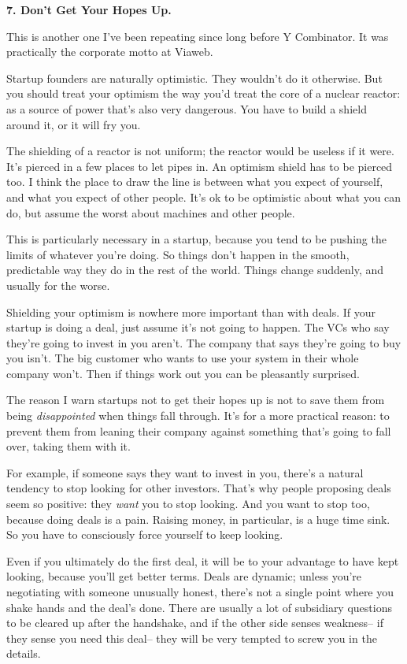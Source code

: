 \documentclass[12pt]{book}
\begin{document}
\textbf{7. Don't Get Your Hopes Up.}

This is another one I've been repeating since long before Y Combinator.
It was practically the corporate motto at Viaweb.

Startup founders are naturally optimistic. They wouldn't do it
otherwise. But you should treat your optimism the way you'd treat the
core of a nuclear reactor: as a source of power that's also very
dangerous. You have to build a shield around it, or it will fry you.

The shielding of a reactor is not uniform; the reactor would be useless
if it were. It's pierced in a few places to let pipes in. An optimism
shield has to be pierced too. I think the place to draw the line is
between what you expect of yourself, and what you expect of other
people. It's ok to be optimistic about what you can do, but assume the
worst about machines and other people.

This is particularly necessary in a startup, because you tend to be
pushing the limits of whatever you're doing. So things don't happen in
the smooth, predictable way they do in the rest of the world. Things
change suddenly, and usually for the worse.

Shielding your optimism is nowhere more important than with deals. If
your startup is doing a deal, just assume it's not going to happen. The
VCs who say they're going to invest in you aren't. The company that says
they're going to buy you isn't. The big customer who wants to use your
system in their whole company won't. Then if things work out you can be
pleasantly surprised.

The reason I warn startups not to get their hopes up is not to save them
from being \emph{disappointed} when things fall through. It's for a more
practical reason: to prevent them from leaning their company against
something that's going to fall over, taking them with it.

For example, if someone says they want to invest in you, there's a
natural tendency to stop looking for other investors. That's why people
proposing deals seem so positive: they \emph{want} you to stop looking.
And you want to stop too, because doing deals is a pain. Raising money,
in particular, is a huge time sink. So you have to consciously force
yourself to keep looking.

Even if you ultimately do the first deal, it will be to your advantage
to have kept looking, because you'll get better terms. Deals are
dynamic; unless you're negotiating with someone unusually honest,
there's not a single point where you shake hands and the deal's done.
There are usually a lot of subsidiary questions to be cleared up after
the handshake, and if the other side senses weakness-- if they sense you
need this deal-- they will be very tempted to screw you in the details.
\end{document}
